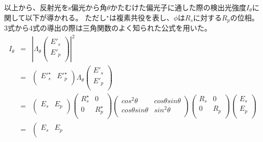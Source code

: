 \documentclass[11pt]{article}
\begin{document}
以上から、反射光をs偏光から角$\theta$かたむけた偏光子に通した際の検出光強度$I_{\theta}$に関して以下が導かれる。
ただし$^{\star}$は複素共役を表し、$\phi$は$R_s$に対する$R_p$の位相。3式から4式の導出の際は三角関数のよく知られた公式を用いた。
\begin{eqnarray*}
  I_{\theta}  
  &=& | {\Lambda}_{\theta} 
  \left(
    \begin{array}{c}
      E'_s \\
      E'_p \\
    \end{array} 
  \right) |^2 \\ 
  &=& \left(
    \begin{array}{cc}
      {E'}_s^{\star} & {E'}_p^{\star} \\
    \end{array}
  \right)
  {\Lambda}_{\theta}
  \left(
    \begin{array}{c}
      E'_s \\
      E'_p \\
    \end{array} 
  \right)\\
  &=&
   \left( 
      \begin{array}{cc}
      E_s & E_p \\
    \end{array}
  \right)
  \left(
    \begin{array}{cc}
      R_s^{\star} & 0 \\
      0 & R_p^{\star} \\
    \end{array}
  \right)
  \left(
    \begin{array}{cc}
      cos^2\theta & cos\theta sin\theta \\
      cos\theta sin\theta & sin^2\theta \\
    \end{array}
  \right)
  \left(
    \begin{array}{cc}
      R_s & 0 \\
      0 & R_p \\
    \end{array}
  \right)
  \left(
    \begin{array}{c}
      E_s \\
      E_p \\
    \end{array}
  \right)\\
  &=&
   \left( 
      \begin{array}{cc}
      E_s & E_p \\

\end{array}
\end{eqnarray*}
\end{document}

